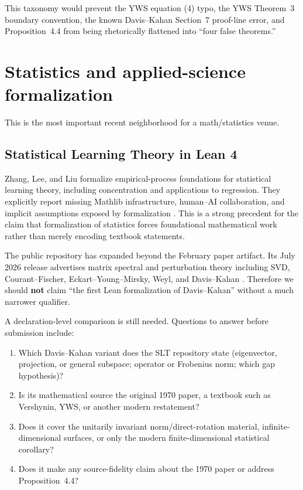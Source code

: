 \documentclass[11pt]{article}
\begin{document}
This taxonomy would prevent the YWS equation (4) typo, the YWS Theorem~3
boundary convention, the known Davis--Kahan Section~7 proof-line error, and
Proposition~4.4 from being rhetorically flattened into ``four false theorems.''

\section{Statistics and applied-science formalization}
\label{sec:stats}

This is the most important recent neighborhood for a math/statistics venue.

\subsection{Statistical Learning Theory in Lean 4}

Zhang, Lee, and Liu formalize empirical-process foundations for statistical
learning theory, including concentration and applications to regression.  They
explicitly report missing Mathlib infrastructure, human--AI collaboration, and
implicit assumptions exposed by formalization \citep{zhang2026slt}.  This is a
strong precedent for the claim that formalization of statistics forces
foundational mathematical work rather than merely encoding textbook statements.

The public repository has expanded beyond the February paper artifact.  Its July
2026 release advertises matrix spectral and perturbation theory including SVD,
Courant--Fischer, Eckart--Young--Mirsky, Weyl, and Davis--Kahan
\citep{zhang2026sltrepo}.  Therefore we should \textbf{not} claim ``the first
Lean formalization of Davis--Kahan'' without a much narrower qualifier.

A declaration-level comparison is still needed.  Questions to answer before
submission include:

\begin{enumerate}
  \item Which Davis--Kahan variant does the SLT repository state (eigenvector,
        projection, or general subspace; operator or Frobenius norm; which gap
        hypothesis)?
  \item Is its mathematical source the original 1970 paper, a textbook such as
        Vershynin, YWS, or another modern restatement?
  \item Does it cover the unitarily invariant norm/direct-rotation material,
        infinite-dimensional surfaces, or only the modern finite-dimensional
        statistical corollary?
  \item Does it make any source-fidelity claim about the 1970 paper or address
        Proposition~4.4?
\end{enumerate}
\end{document}
